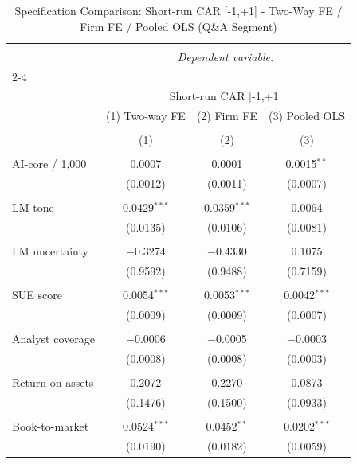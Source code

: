 
\begin{table}[!htbp] \centering 
  \caption{Specification Comparison: Short-run CAR [-1,+1] - Two-Way FE / Firm FE / Pooled OLS (Q\&A Segment)} 
  \label{} 
\begin{tabular}{@{\extracolsep{5pt}}lccc} 
\\[-1.8ex]\hline 
\hline \\[-1.8ex] 
 & \multicolumn{3}{c}{\textit{Dependent variable:}} \\ 
\cline{2-4} 
\\[-1.8ex] & \multicolumn{3}{c}{Short-run CAR [-1,+1]} \\ 
 & (1) Two-way FE & (2) Firm FE & (3) Pooled OLS \\ 
\\[-1.8ex] & (1) & (2) & (3)\\ 
\hline \\[-1.8ex] 
 AI-core / 1,000 & 0.0007 & 0.0001 & 0.0015$^{**}$ \\ 
  & (0.0012) & (0.0011) & (0.0007) \\ 
  & & & \\ 
 LM tone & 0.0429$^{***}$ & 0.0359$^{***}$ & 0.0064 \\ 
  & (0.0135) & (0.0106) & (0.0081) \\ 
  & & & \\ 
 LM uncertainty & $-$0.3274 & $-$0.4330 & 0.1075 \\ 
  & (0.9592) & (0.9488) & (0.7159) \\ 
  & & & \\ 
 SUE score & 0.0054$^{***}$ & 0.0053$^{***}$ & 0.0042$^{***}$ \\ 
  & (0.0009) & (0.0009) & (0.0007) \\ 
  & & & \\ 
 Analyst coverage & $-$0.0006 & $-$0.0005 & $-$0.0003 \\ 
  & (0.0008) & (0.0008) & (0.0003) \\ 
  & & & \\ 
 Return on assets & 0.2072 & 0.2270 & 0.0873 \\ 
  & (0.1476) & (0.1500) & (0.0933) \\ 
  & & & \\ 
 Book-to-market & 0.0524$^{***}$ & 0.0452$^{**}$ & 0.0202$^{***}$ \\ 
  & (0.0190) & (0.0182) & (0.0059) \\ 

\end{tabular}
\end{table}
